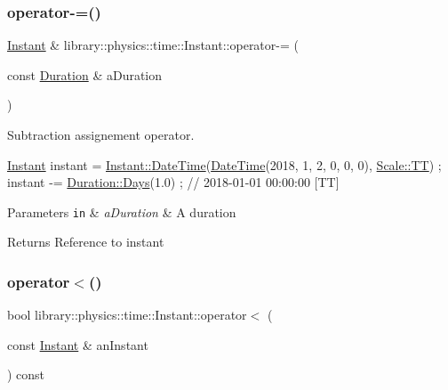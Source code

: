 \subsubsection{\texorpdfstring{operator-\/=()}{operator-=()}}
{\footnotesize\ttfamily \hyperlink{classlibrary_1_1physics_1_1time_1_1_instant}{Instant} \& library\+::physics\+::time\+::\+Instant\+::operator-\/= (\begin{DoxyParamCaption}\item[{const \hyperlink{classlibrary_1_1physics_1_1time_1_1_duration}{Duration} \&}]{a\+Duration }\end{DoxyParamCaption})}



Subtraction assignement operator. 


\begin{DoxyCode}
\hyperlink{classlibrary_1_1physics_1_1time_1_1_instant_a7916a9d8acb9de4eda35f9d72086a618}{Instant} instant = \hyperlink{classlibrary_1_1physics_1_1time_1_1_instant_ac827b6ffa57ce75a3c56c462d4c872f8}{Instant::DateTime}(\hyperlink{classlibrary_1_1physics_1_1time_1_1_instant_ac827b6ffa57ce75a3c56c462d4c872f8}{DateTime}(2018, 1, 2, 0, 0, 0), 
      \hyperlink{namespacelibrary_1_1physics_1_1time_a09d2bc9fbc7b0b5f92e1419bd655e6bbadf1f3edb9115acb0a1e04209b7a9937b}{Scale::TT}) ;
instant -= \hyperlink{classlibrary_1_1physics_1_1time_1_1_duration_abf1323fa113b5203747ce9aec5c969fc}{Duration::Days}(1.0) ; \textcolor{comment}{// 2018-01-01 00:00:00 [TT]}
\end{DoxyCode}



\begin{DoxyParams}[1]{Parameters}
\mbox{\tt in}  & {\em a\+Duration} & A duration \\
\hline
\end{DoxyParams}
\begin{DoxyReturn}{Returns}
Reference to instant 
\end{DoxyReturn}
\mbox{\label{classlibrary_1_1physics_1_1time_1_1_instant_a6b211c85f6eaa9c5122c068280a65878}} 
\subsubsection{\texorpdfstring{operator$<$()}{operator<()}}
{\footnotesize\ttfamily bool library\+::physics\+::time\+::\+Instant\+::operator$<$ (\begin{DoxyParamCaption}\item[{const \hyperlink{classlibrary_1_1physics_1_1time_1_1_instant}{Instant} \&}]{an\+Instant }\end{DoxyParamCaption}) const}



